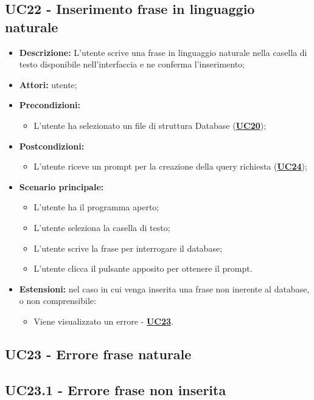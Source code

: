 \documentclass[5pt]{article}
\begin{document}
\subsection{UC22 - Inserimento frase in linguaggio naturale}
\label{sec:UC22}
\begin{itemize}
	\item \textbf{Descrizione:} L’utente scrive una frase in linguaggio naturale nella casella di testo disponibile nell’interfaccia e ne conferma l’inserimento;
	\item \textbf{Attori:} utente;
	\item \textbf{Precondizioni:} 
	\begin{itemize}
		\item L’utente ha selezionato un file di struttura Database (\hyperref[sec:UC20]{\textbf{UC20}});
	\end{itemize}
	\item \textbf{Postcondizioni:} 
	\begin{itemize}
		\item L’utente riceve un prompt per la creazione della query richiesta (\hyperref[sec:UC24]{\textbf{UC24}});
	\end{itemize}
	\item \textbf{Scenario principale:} 
	\begin{itemize}
		\item L’utente ha il programma aperto;
		\item L’utente seleziona la casella di testo;
		\item L’utente scrive la frase per interrogare il database;
		\item L’utente clicca il pulsante apposito per ottenere il prompt.
	\end{itemize}
	\item \textbf{Estensioni:} nel caso in cui venga inserita una frase non inerente al database, o non comprensibile:
	\begin{itemize}
		\item Viene visualizzato un errore - \hyperref[sec:UC23]{\textbf{UC23}}.
	\end{itemize}
\end{itemize}

\subsection{UC23 - Errore frase naturale}
\label{sec:UC23}

\subsection{UC23.1 - Errore frase non inserita}
\label{sec:UC23.1}
\end{document}
